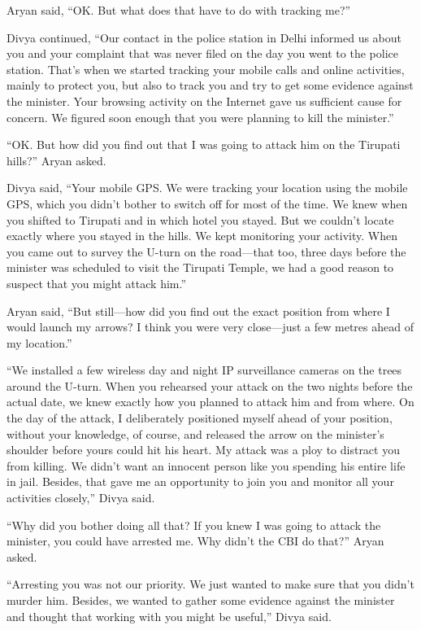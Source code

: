 Aryan said, “OK. But what does that have to do with tracking me?”

Divya continued, “Our contact in the police station in Delhi informed us about
you and your complaint that was never filed on the day you went to the police
station. That's when we started tracking your mobile calls and online
activities, mainly to protect you, but also to track you and try to get some
evidence against the minister. Your browsing activity on the Internet gave us
sufficient cause for concern. We figured soon enough that you were planning to
kill the minister.”

“OK. But how did you find out that I was going to attack him on the Tirupati
hills?” Aryan asked.

Divya said, “Your mobile GPS. We were tracking your location using the mobile
GPS, which you didn't bother to switch off for most of the time. We knew when
you shifted to Tirupati and in which hotel you stayed. But we couldn't locate
exactly where you stayed in the hills. We kept monitoring your activity. When
you came out to survey the U-turn on the road—that too, three days before the
minister was scheduled to visit the Tirupati Temple, we had a good reason to
suspect that you might attack him.”

Aryan said, “But still—how did you find out the exact position from where I
would launch my arrows? I think you were very close—just a few metres ahead of
my location.”

“We installed a few wireless day and night IP surveillance cameras on the trees
around the U-turn. When you rehearsed your attack on the two nights before the
actual date, we knew exactly how you planned to attack him and from where. On
the day of the attack, I deliberately positioned myself ahead of your position,
without your knowledge, of course, and released the arrow on the minister's
shoulder before yours could hit his heart. My attack was a ploy to distract you
from killing. We didn't want an innocent person like you spending his entire life
in jail. Besides, that gave me an opportunity to join you and monitor all your
activities closely,” Divya said.

“Why did you bother doing all that? If you knew I was going to attack the
minister, you could have arrested me. Why didn't the CBI do that?” Aryan asked.

“Arresting you was not our priority. We just wanted to make sure that you didn't
murder him. Besides, we wanted to gather some evidence against the minister and
thought that working with you might be useful,” Divya said.

